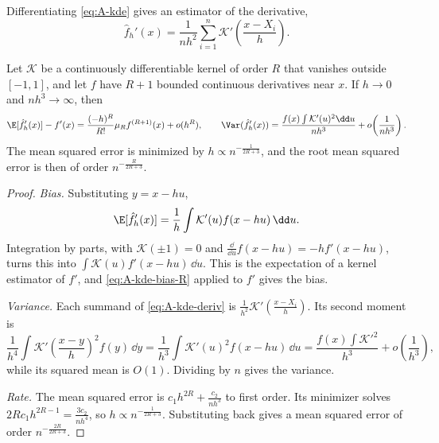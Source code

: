 Differentiating \eqref{eq:A-kde} gives an estimator of the derivative,
\begin{equation}\label{eq:A-kde-deriv}
\hat f_h'(x)=\frac{1}{nh^2}\sum_{i=1}^{n}\mathcal{K}'\!\left(\frac{x-X_i}{h}\right).
\end{equation}

\begin{proposition}\label{prop:A-kde-derivative}
Let $\mathcal{K}$ be a continuously differentiable kernel of order $R$ that vanishes outside $[-1,1]$, and
let $f$ have $R+1$ bounded continuous derivatives near $x$. If $h\to0$ and $nh^3\to\infty$, then
\begin{equation*}
\E[\hat f_h'(x)]-f'(x)=\frac{(-h)^R}{R!}\mu_Rf^{(R+1)}(x)+o(h^R),\qquad
\Var(\hat f_h'(x))=\frac{f(x)\int\mathcal{K}'(u)^2\dd u}{nh^3}+o\!\left(\frac{1}{nh^3}\right).
\end{equation*}
The mean squared error is minimized by $h\propto n^{-\frac{1}{2R+3}}$, and the root mean squared error is
then of order $n^{-\frac{R}{2R+3}}$.
\end{proposition}

\begin{proof}
\emph{Bias.} Substituting $y=x-hu$,
\begin{equation*}
\E[\hat f_h'(x)]=\frac{1}{h}\int\mathcal{K}'(u)f(x-hu)\,\dd u .
\end{equation*}
Integration by parts, with $\mathcal{K}(\pm1)=0$ and $\frac{\dd}{\dd u}f(x-hu)=-hf'(x-hu)$, turns this into
$\int\mathcal{K}(u)f'(x-hu)\,\dd u$. This is the expectation of a kernel estimator of $f'$, and
\eqref{eq:A-kde-bias-R} applied to $f'$ gives the bias.

\emph{Variance.} Each summand of \eqref{eq:A-kde-deriv} is $\frac{1}{h^2}\mathcal{K}'(\frac{x-X_i}{h})$.
Its second moment is
\begin{equation*}
\frac{1}{h^4}\int\mathcal{K}'\!\left(\frac{x-y}{h}\right)^2f(y)\,\dd y=\frac{1}{h^3}\int\mathcal{K}'(u)^2f(x-hu)\,\dd u
=\frac{f(x)\int\mathcal{K}'^2}{h^3}+o\!\left(\frac{1}{h^3}\right),
\end{equation*}
while its squared mean is $O(1)$. Dividing by $n$ gives the variance.

\emph{Rate.} The mean squared error is $c_1h^{2R}+\frac{c_2}{nh^3}$ to first order. Its minimizer solves
$2Rc_1h^{2R-1}=\frac{3c_2}{nh^4}$, so $h\propto n^{-\frac{1}{2R+3}}$. Substituting back gives a mean
squared error of order $n^{-\frac{2R}{2R+3}}$.
\end{proof}

